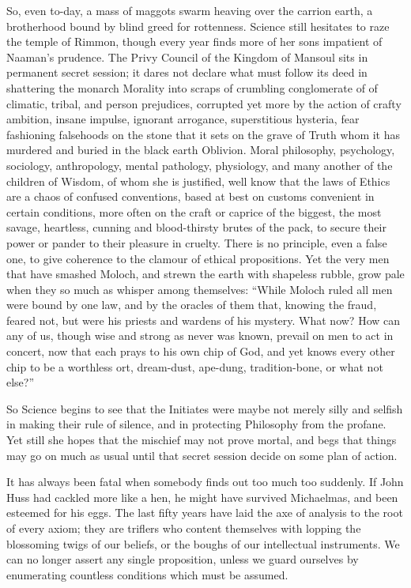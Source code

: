 So, even to-day, a mass of maggots swarm heaving over the carrion earth, a brotherhood bound by blind greed for rottenness. Science still hesitates to raze the temple of Rimmon, though every year finds more of her sons impatient of Naaman's prudence. The Privy Council of the Kingdom of Mansoul sits in permanent secret session; it dares not declare what must follow its deed in shattering the monarch Morality into scraps of crumbling conglomerate of of climatic, tribal, and person prejudices, corrupted yet more by the action of crafty ambition, insane impulse, ignorant arrogance, superstitious hysteria, fear fashioning falsehoods on the stone that it sets on the grave of Truth whom it has murdered and buried in the black earth Oblivion. Moral philosophy, psychology, sociology, anthropology, mental pathology, physiology, and many another of the children of Wisdom, of whom she is justified, well know that the laws of Ethics are a chaos of confused conventions, based at best on customs convenient in certain conditions, more often on the craft or caprice of the biggest, the most savage, heartless, cunning and blood-thirsty brutes of the pack, to secure their power or pander to their pleasure in cruelty. There is no principle, even a false one, to give coherence to the clamour of ethical propositions. Yet the very men that have smashed Moloch, and strewn the earth with shapeless rubble, grow pale when they so much as whisper among themselves: \enquote{While Moloch ruled all men were bound by one law, and by the oracles of them that, knowing the fraud, feared not, but were his priests and wardens of his mystery. What now? How can any of us, though wise and strong as never was known, prevail on men to act in concert, now that each prays to his own chip of God, and yet knows every other chip to be a worthless ort, dream-dust, ape-dung, tradition-bone, or \textemdash{} what not else?}

So Science begins to see that the Initiates were maybe not merely silly and selfish in making their rule of silence, and in protecting Philosophy from the profane. Yet still she hopes that the mischief may not prove mortal, and begs that things may go on much as usual until that secret session decide on some plan of action.

It has always been fatal when somebody finds out too much too suddenly. If John Huss had cackled more like a hen, he might have survived Michaelmas, and been esteemed for his eggs. The last fifty years have laid the axe of analysis to the root of every axiom; they are triflers who content themselves with lopping the blossoming twigs of our beliefs, or the boughs of our intellectual instruments. We can no longer assert any single proposition, unless we guard ourselves by enumerating countless conditions which must be assumed.

